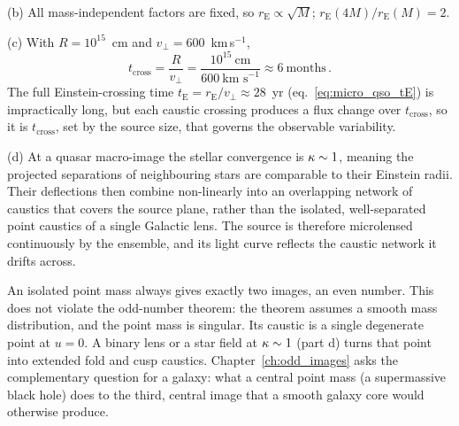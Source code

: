 (b) All mass-independent factors are fixed, so
$r_{\mathrm{E}} \propto \sqrt{M}$; $r_{\mathrm{E}}(4M)/r_{\mathrm{E}}(M) = 2$.
\checkmark

(c) With $R = 10^{15}$~cm and $v_\perp = 600$~km\,s$^{-1}$,
\begin{equation*}
    t_{\mathrm{cross}} = \frac{R}{v_\perp}
    = \frac{10^{15}~\text{cm}}{600~\text{km s}^{-1}}
    \approx 6~\text{months} \,.
\end{equation*}
The full Einstein-crossing time $t_{\mathrm{E}} = r_{\mathrm{E}}/v_\perp
\approx 28$~yr (eq.~\ref{eq:micro_qso_tE}) is impractically long, but each
caustic crossing produces a flux change over
$t_{\mathrm{cross}}$, so it is $t_{\mathrm{cross}}$, set by the source
size, that governs the observable variability. \checkmark

(d) At a quasar macro-image the stellar convergence is
$\kappa \sim 1$, meaning the projected separations of neighbouring stars are
comparable to their Einstein radii.  Their deflections then combine
non-linearly into an overlapping network of caustics that covers the
source plane, rather than the isolated, well-separated point caustics of a
single Galactic lens.  The source is therefore microlensed continuously by the
ensemble, and its light curve reflects the caustic network it drifts across.
\checkmark

\begin{bridge}
An isolated point mass always gives exactly two images, an even number.  This
does not violate the odd-number theorem: the theorem assumes a smooth mass
distribution, and the point mass is singular.  Its caustic is a single
degenerate point at $u = 0$.  A binary lens or a star field at $\kappa \sim 1$
(part d) turns that point into extended fold and cusp caustics.
Chapter~\ref{ch:odd_images} asks the complementary question for a galaxy: what
a central point mass (a supermassive black hole) does to the third, central
image that a smooth galaxy core would otherwise produce.
\end{bridge}
